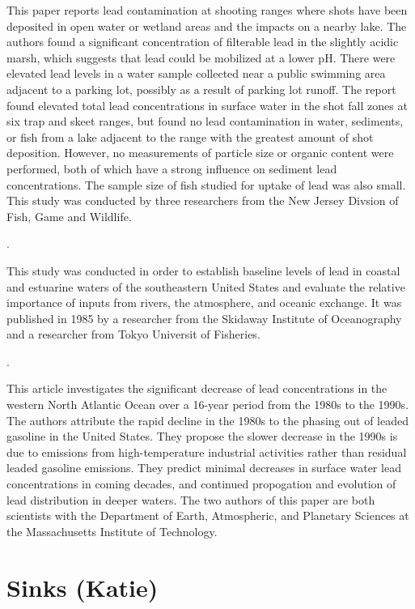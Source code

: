 \documentclass{article}
\begin{document}
This paper reports lead contamination at shooting ranges where shots have been deposited in open water or wetland areas and the impacts on a nearby lake. The authors found a significant concentration of filterable lead in the slightly acidic marsh, which suggests that lead could be mobilized at a lower pH. There were elevated lead levels in a  water sample collected near a public swimming area adjacent to a parking lot, possibly as a result of parking lot runoff. The report found elevated total lead concentrations in surface water in the shot fall zones at six trap and skeet ranges, but found no lead contamination in water, sediments, or fish from a lake adjacent to the range with the greatest amount of shot deposition. However, no measurements of particle size or organic content were performed, both of which have a strong influence on sediment lead concentrations. The sample size of fish studied for uptake of lead was also small. This study was conducted by three researchers from the New Jersey Divsion of Fish, Game and Wildlife. 

\medskip
\noindent {}.
\medskip

This study was conducted in order to establish baseline levels of lead in coastal and estuarine waters of the southeastern United States and evaluate the relative importance of inputs from rivers, the atmosphere, and oceanic exchange. It was published in 1985 by a researcher from the Skidaway Institute of Oceanography and a researcher from Tokyo Universit of Fisheries.

\medskip
\noindent {}.
\medskip

This article investigates the significant decrease of lead concentrations in the western North Atlantic Ocean over a 16-year period from the 1980s to the 1990s. The authors attribute the rapid decline in the 1980s to the phasing out of leaded gasoline in the United States. They propose the slower decrease in the 1990s is due to emissions from high-temperature industrial activities rather than residual leaded gasoline emissions. They predict minimal decreases in surface water lead concentrations in coming decades, and continued propogation and evolution of lead distribution in deeper waters. The two authors of this paper are both scientists with the Department of Earth, Atmospheric, and Planetary Sciences at the Massachusetts Institute of Technology.


\section{Sinks (Katie)}
\end{document}

